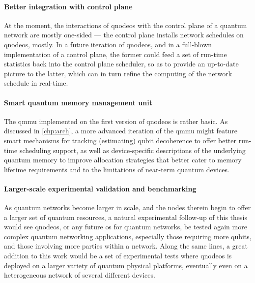 \paragraph{Better integration with control plane}

At the moment, the interactions of \acrshort{qnodeos} with the control plane of a quantum network
are mostly one-sided --- the control plane installs network schedules on \acrshort{qnodeos}, mostly.
In a future iteration of \acrshort{qnodeos}, and in a full-blown implementation of a control plane,
the former could feed a set of run-time statistics back into the control plane scheduler, so as to
provide an up-to-date picture to the latter, which can in turn refine the computing of the network
schedule in real-time.

\paragraph{Smart quantum memory management unit}

The \acrfull{qmmu} implemented on the first version of \acrshort{qnodeos} is rather basic. As
discussed in \cref{chp:arch}, a more advanced iteration of the \acrshort{qmmu} might feature smart
mechanisms for tracking (estimating) qubit decoherence to offer better run-time scheduling support,
as well as device-specific descriptions of the underlying quantum memory to improve allocation
strategies that better cater to memory lifetime requirements and to the limitations of near-term
quantum devices.

\paragraph{Larger-scale experimental validation and benchmarking}

As quantum networks become larger in scale, and the nodes therein begin to offer a larger set of
quantum resources, a natural experimental follow-up of this thesis would see \acrshort{qnodeos}, or
any future \acrshort{os} for quantum networks, be tested again more complex quantum networking
applications, especially those requiring more qubits, and those involving more parties within a
network. Along the same lines, a great addition to this work would be a set of experimental tests
where \acrshort{qnodeos} is deployed on a larger variety of quantum physical platforms, eventually
even on a heterogeneous network of several different devices.

\printbibliography[heading=subbibintoc,title={References},notcategory=noprint]
